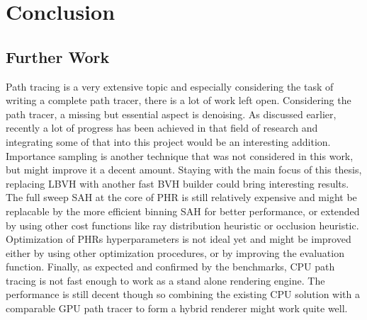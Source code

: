 \section{Conclusion}

\subsection{Further Work}
Path tracing is a very extensive topic and especially considering the task of writing a complete path tracer, there is a lot of work left open. Considering the path tracer, a missing but essential aspect is denoising. As discussed earlier, recently a lot of progress has been achieved in that field of research and integrating some of that into this project would be an interesting addition. Importance sampling is another technique that was not considered in this work, but might improve it a decent amount. 
Staying with the main focus of this thesis, replacing LBVH with another fast BVH builder could bring interesting results. The full sweep SAH at the core of PHR is still relatively expensive and might be replacable by the more efficient binning SAH for better performance, or extended by using other cost functions like ray distribution heuristic or occlusion heuristic. Optimization of PHRs hyperparameters is not ideal yet and might be improved either by using other optimization procedures, or by improving the evaluation function. 
Finally, as expected and confirmed by the benchmarks, CPU path tracing is not fast enough to work as a stand alone rendering engine. The performance is still decent though so combining the existing CPU solution with a comparable GPU path tracer to form a hybrid renderer might work quite well. 